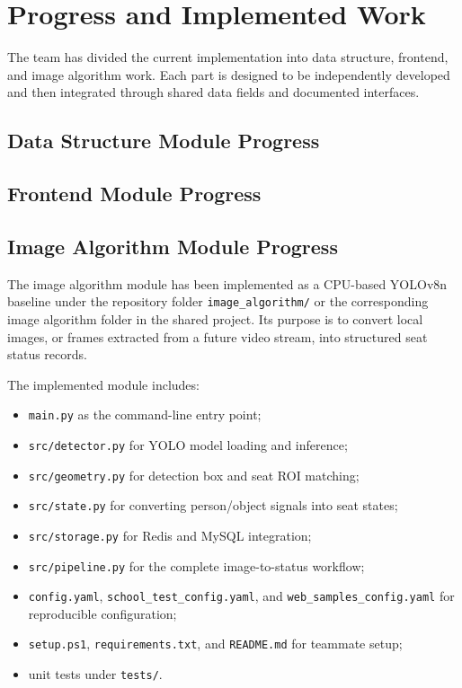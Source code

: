 \section{Progress and Implemented Work}

The team has divided the current implementation into data structure, frontend, and image algorithm work. Each part is designed to be independently developed and then integrated through shared data fields and documented interfaces.

\subsection{Data Structure Module Progress}


\subsection{Frontend Module Progress}


\subsection{Image Algorithm Module Progress}

The image algorithm module has been implemented as a CPU-based YOLOv8n baseline under the repository folder \texttt{image\_algorithm/} or the corresponding image algorithm folder in the shared project. Its purpose is to convert local images, or frames extracted from a future video stream, into structured seat status records.

The implemented module includes:

\begin{itemize}
  \item \texttt{main.py} as the command-line entry point;
  \item \texttt{src/detector.py} for YOLO model loading and inference;
  \item \texttt{src/geometry.py} for detection box and seat ROI matching;
  \item \texttt{src/state.py} for converting person/object signals into seat states;
  \item \texttt{src/storage.py} for Redis and MySQL integration;
  \item \texttt{src/pipeline.py} for the complete image-to-status workflow;
  \item \texttt{config.yaml}, \texttt{school\_test\_config.yaml}, and \texttt{web\_samples\_config.yaml} for reproducible configuration;
  \item \texttt{setup.ps1}, \texttt{requirements.txt}, and \texttt{README.md} for teammate setup;
  \item unit tests under \texttt{tests/}.
\end{itemize}


